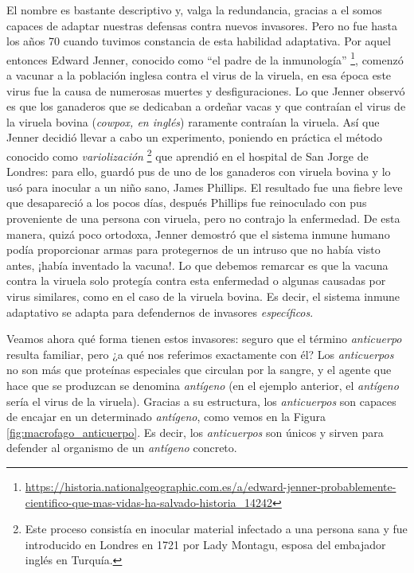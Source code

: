 El nombre es bastante descriptivo y, valga la redundancia, gracias a el somos capaces de adaptar nuestras defensas contra nuevos invasores. Pero no fue hasta los años 70 cuando tuvimos constancia de esta habilidad adaptativa. Por aquel entonces Edward Jenner, conocido como ``el padre de la inmunología'' \footnote{\url{https://historia.nationalgeographic.com.es/a/edward-jenner-probablemente-cientifico-que-mas-vidas-ha-salvado-historia_14242}}, comenzó a vacunar a la población inglesa contra el virus de la viruela, en esa época este virus fue la causa de numerosas muertes y desfiguraciones. Lo que Jenner observó es que los ganaderos que se dedicaban a ordeñar vacas y que contraían el virus de la viruela bovina (\textit{cowpox, en inglés}) raramente contraían la viruela. Así que Jenner decidió llevar a cabo un experimento, poniendo en práctica el método conocido como \textit{variolización} \footnote{Este proceso consistía en inocular material infectado a una persona sana y fue introducido en Londres en 1721 por  Lady Montagu, esposa del embajador inglés en Turquía.} que aprendió en el hospital de San Jorge de Londres: para ello, guardó pus de uno de los ganaderos con viruela bovina y lo usó para inocular a un niño sano, James Phillips. El resultado fue una fiebre leve que desapareció a los pocos días, después Phillips fue reinoculado con pus proveniente de una persona con viruela, pero no contrajo la enfermedad. De esta manera, quizá poco ortodoxa, Jenner demostró que el sistema inmune humano podía proporcionar armas para protegernos de un intruso que no había visto antes, ¡había inventado la vacuna!. Lo que debemos remarcar es que la vacuna contra la viruela solo protegía contra esta enfermedad o algunas causadas por virus similares, como en el caso de la viruela bovina. Es decir, el sistema inmune adaptativo se adapta para defendernos de invasores \textit{específicos}. 

Veamos ahora qué forma tienen estos invasores: seguro que el término \textit{anticuerpo} resulta familiar, pero ¿a qué nos referimos exactamente con él? Los \textit{anticuerpos} no son más que proteínas especiales que circulan por la sangre, y el agente que hace que se produzcan se denomina \textit{antígeno} (en el ejemplo anterior, el \textit{antígeno} sería el virus de la viruela). Gracias a su estructura, los \textit{anticuerpos} son capaces de encajar en un determinado \textit{antígeno}, como vemos en la Figura \ref{fig:macrofago_anticuerpo}. Es decir, los \textit{anticuerpos} son únicos y sirven para defender al organismo de un \textit{antígeno} concreto.	

